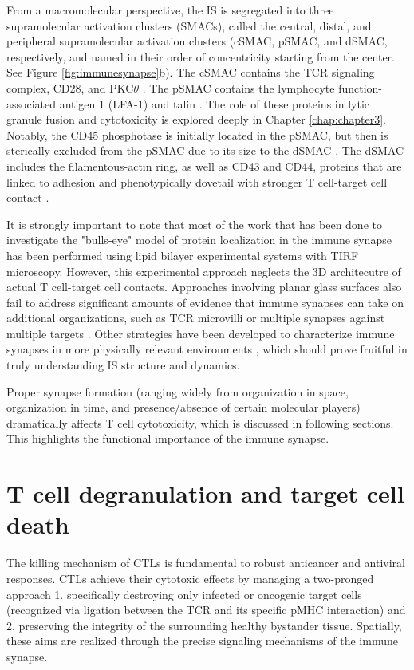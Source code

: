 From a macromolecular perspective, the IS is segregated into three supramolecular activation clusters (SMACs), called the central, distal, and peripheral supramolecular activation clusters (cSMAC, pSMAC, and dSMAC, respectively, and named in their order of concentricity starting from the center. See Figure \ref{fig:immunesynapse}b). The cSMAC contains the TCR signaling complex, CD28, and PKC$\theta$ \cite{Monks1998, Tseng2008}. The pSMAC contains the lymphocyte function-associated antigen 1 (LFA-1) and talin \cite{Monks1998}. The role of these proteins in lytic granule fusion and cytotoxicity is explored deeply in Chapter \ref{chap:chapter3}. Notably, the CD45 phosphotase is initially located in the pSMAC, but then is sterically excluded from the pSMAC due to its size to the dSMAC \cite{Johnson2000}. The dSMAC includes the filamentous-actin ring, as well as CD43 and CD44, proteins that are linked to adhesion and phenotypically dovetail with stronger T cell-target cell contact \cite{Yu2013}.

It is strongly important to note that most of the work that has been done to investigate the "bulls-eye" model of protein localization in the immune synapse has been performed using lipid bilayer experimental systems with TIRF microscopy. However, this experimental approach neglects the 3D architecutre of actual T cell-target cell contacts.  Approaches involving planar glass surfaces also fail to address significant amounts of evidence that immune synapses can take on additional organizations, such as TCR microvilli \cite{Kim2018} or multiple synapses against multiple targets \cite{Vorselen2020}. Other strategies have been developed to characterize immune synapses in more physically relevant environments  \cite{Jin2019}, which should prove fruitful in truly understanding IS structure and dynamics.

Proper synapse formation (ranging widely from organization in space, organization in time, and presence/absence of certain molecular players) dramatically affects T cell cytotoxicity, which is discussed in following sections. This highlights the functional importance of the immune synapse.

\section{T cell degranulation and target cell death}
\label{T cell degranulation and target cell death}
The killing mechanism of CTLs is fundamental to robust anticancer and antiviral responses.  CTLs achieve their cytotoxic effects by managing a two-pronged approach 1. specifically destroying only infected or oncogenic target cells (recognized via ligation between the TCR and its specific pMHC interaction) and 2. preserving the integrity of the surrounding healthy bystander tissue. Spatially, these aims are realized through the precise signaling mechanisms of the immune synapse.

